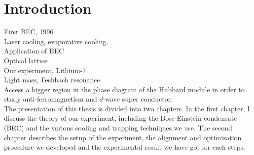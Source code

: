\chapter*{Introduction}

First BEC, 1996\\
Laser cooling, evaporative cooling.\\
Application of BEC\\
Optical lattice\\


Our experiment, Lithium-$7$\\
Light mass, Feshbach resonance.\\
Access a bigger region in the phase diagram of the Hubbard module in order to study anti-ferromagnetism and $d$-wave super conductor.\\


The presentation of this thesis is divided into two chapters. In the first chapter, I discuss the theory of our experiment, including the Bose-Einstein condensate (BEC) and the various cooling and trapping techniques we use. The second chapter describes the setup of the experiment, the alignment and optimization procedure we developed and the experimental result we have got for each steps.
